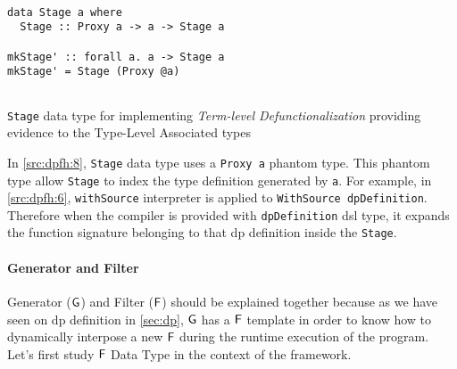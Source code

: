 \begin{listing}[htp!]
  \begin{verbatim}

data Stage a where
  Stage :: Proxy a -> a -> Stage a

mkStage' :: forall a. a -> Stage a
mkStage' = Stage (Proxy @a)
    
  \end{verbatim}
  \caption[{[\texttt{Stage.hs}] Stage Data Type}]{\texttt{Stage} data type for implementing \emph{Term-level Defunctionalization} providing evidence to the Type-Level Associated types}
  \label{src:dpfh:8}
\end{listing}

In \autoref{src:dpfh:8}, \texttt{Stage} data type uses a \texttt{Proxy a} phantom type. 
This phantom type allow \texttt{Stage} to index the type definition generated by \texttt{a}.
For example, in \autoref{src:dpfh:6}, \texttt{withSource} interpreter is applied to \texttt{WithSource dpDefinition}. 
Therefore when the compiler is provided with \texttt{dpDefinition} \acrshort{dsl} type, it expands the function signature belonging to that \acrshort{dp} definition inside the \texttt{Stage}.

\paragraph{Generator and Filter}
Generator ($\mathsf{G}$) and Filter ($\mathsf{F}$) should be explained together because as we have seen on \acrshort{dp} definition in \autoref{sec:dp},
$\mathsf{G}$ has a $\mathsf{F}$ template in order to know how to dynamically interpose a new $\mathsf{F}$ during the runtime execution of the program.
Let's first study $\mathsf{F}$ Data Type in the context of the framework.

